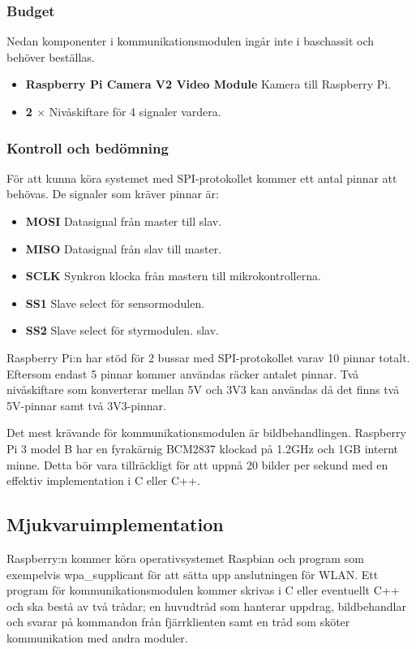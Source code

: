 \documentclass[designspec/spec.tex]{subfiles}
\begin{document}
\subsubsection{Budget}
    Nedan komponenter i kommunikationsmodulen ingår inte i baschassit och
    behöver beställas.
\begin{itemize}
    \item \textbf{Raspberry Pi Camera V2 Video Module} Kamera till Raspberry
    Pi.
    \item \textbf{2 $\times$ \modShifter} Nivåskiftare för 4 signaler
    vardera.
\end{itemize}

\subsubsection{Kontroll och bedömning}
För att kunna köra systemet med SPI-protokollet kommer ett antal pinnar att
behövas. De signaler som kräver pinnar är:
\begin{itemize}
    \item \textbf{MOSI} Datasignal från master till slav.
    \item \textbf{MISO} Datasignal från slav till master.
    \item \textbf{SCLK} Synkron klocka från mastern till mikrokontrollerna.
    \item \textbf{SS1} Slave select för sensormodulen.
    \item \textbf{SS2} Slave select för styrmodulen.
    slav.
\end{itemize}
Raspberry Pi:n har stöd för 2 bussar med SPI-protokollet varav 10 pinnar
totalt. Eftersom endast 5 pinnar kommer användas räcker antalet pinnar.  Två
nivåskiftare som konverterar mellan 5V och 3V3 kan användas då det finns två
5V-pinnar samt två 3V3-pinnar.

Det mest krävande för kommunikationsmodulen är bildbehandlingen. Raspberry Pi
3 model B har en fyrakärnig BCM2837 klockad på 1.2GHz och 1GB internt minne.
Detta bör vara tillräckligt för att uppnå 20 bilder per sekund med en effektiv
implementation i C eller C++.

\subsection{Mjukvaruimplementation}
Raspberry:n kommer köra operativsystemet Raspbian och program som exempelvis
wpa\_supplicant för att sätta upp anslutningen för WLAN. Ett program för
kommunikationsmodulen kommer skrivas i C eller eventuellt C++ och ska bestå av
två trådar; en huvudtråd som hanterar uppdrag, bildbehandlar och svarar på
kommandon från fjärrklienten samt en tråd som sköter kommunikation med andra
moduler.
\end{document}
